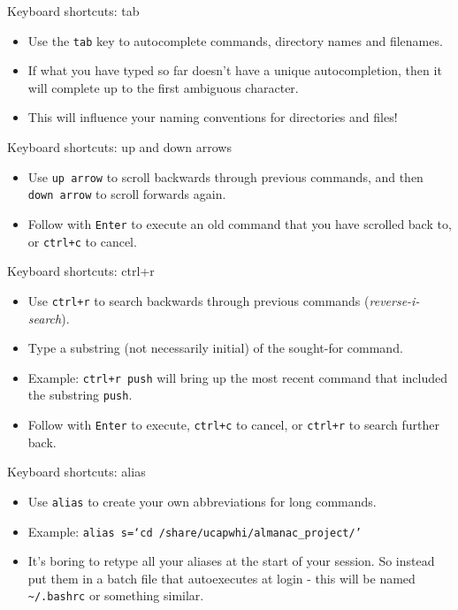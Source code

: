 \documentclass[dvipsnames]{beamer}
\newcommand{\command}[1]{\colorbox{light-gray}{\texttt{#1}}}
\newcommand{\filename}[1]{\colorbox{light-green}{\texttt{#1}}}
\begin{document}
\begin{frame}{Keyboard shortcuts: tab}
  \begin{itemize}
    \item Use the \command{tab} key to autocomplete commands, directory names and filenames.
    \item If what you have typed so far doesn't have a unique autocompletion, then it will complete up to the first ambiguous character.
    \item This will influence your naming conventions for directories and files!
  \end{itemize}
\end{frame}


\begin{frame}{Keyboard shortcuts: up and down arrows}
  \begin{itemize}
    \item Use \command{up arrow} to scroll backwards through previous commands, and then \command{down arrow} to scroll forwards again.
    \item Follow with \command{Enter} to execute an old command that you have scrolled back to, or \command{ctrl+c} to cancel.
  \end{itemize}
\end{frame}


\begin{frame}{Keyboard shortcuts: ctrl+r}
  \begin{itemize}
    \item Use \command{ctrl+r} to search backwards through previous commands (\textit{reverse-i-search}).
    \item Type a substring (not necessarily initial) of the sought-for command.
    \item Example: \command{ctrl+r push} will bring up the most recent command that included the substring \command{push}.
    \item Follow with \command{Enter} to execute, \command{ctrl+c} to cancel, or \command{ctrl+r} to search further back.
  \end{itemize}
\end{frame}


\begin{frame}{Keyboard shortcuts: alias}
  \begin{itemize}
    \item Use \command{alias} to create your own abbreviations for long commands.
    \item Example: \command{alias s=`cd /share/ucapwhi/almanac\_project/'}
    \item It's boring to retype all your aliases at the start of your session. So instead put them in a batch file that autoexecutes at login - this will be named \filename{\textasciitilde/.bashrc} or something similar.
  \end{itemize}
\end{frame}
\end{document}
